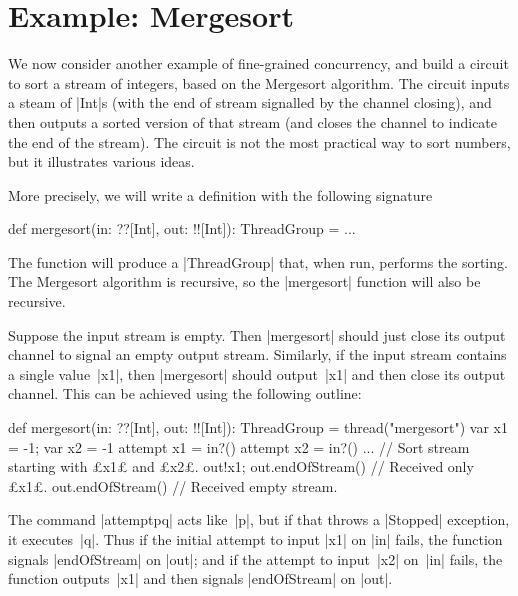 \section{Example: Mergesort}
\label{sec:mergesort}

We now consider another example of fine-grained concurrency, and build a
circuit to sort a stream of integers, based on the Mergesort algorithm.  The
circuit inputs a steam of |Int|s (with the end of stream signalled by the
channel closing), and then outputs a sorted version of that stream (and closes
the channel to indicate the end of the stream).  The circuit is not the most
practical way to sort numbers, but it illustrates various ideas.

More precisely, we will write a  definition with the following signature
%
\begin{scala}
  def mergesort(in: ??[Int], out: !![Int]): ThreadGroup = ...
\end{scala}
%
The function will produce a |ThreadGroup| that, when run, performs the
sorting.  The Mergesort algorithm is recursive, so the |mergesort| function
will also be recursive.

Suppose the input stream is empty.  Then |mergesort| should just close its
output channel to signal an empty output stream.  Similarly, if the input
stream contains a single value~|x1|, then |mergesort| should output~|x1| and
then close its output channel.  This can be achieved using the following
outline:
%
\begin{mysamepage}
\begin{scala}
  def mergesort(in: ??[Int], out: !![Int]): ThreadGroup = thread("mergesort"){
    var x1 = -1; var x2 = -1
    attempt{ 
      x1 = in?()
      attempt{
        x2 = in?()
        ...   // Sort stream starting with £x1£ and £x2£.
      }{ out!x1; out.endOfStream() } // Received only £x1£.
    }{ out.endOfStream() } // Received empty stream.
  }
\end{scala}
\end{mysamepage}
%
The command |attempt{p}{q}| acts like~|p|, but if that throws a |Stopped|
exception, it executes~|q|.  Thus if the initial attempt to input |x1| on |in|
fails, the function signals |endOfStream| on |out|; and if the attempt to
input~|x2| on~|in| fails, the function outputs~|x1| and then signals
|endOfStream| on |out|.

